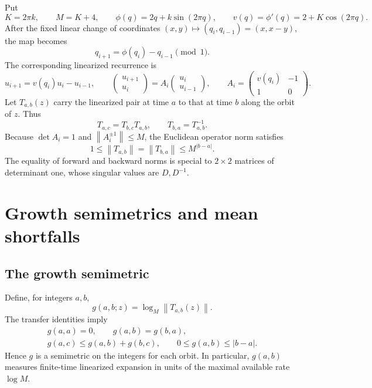 \documentclass[11pt,a4paper]{article}
\newcommand{\norm}[1]{\left\lVert #1\right\rVert}
\begin{document}
Put
\begin{equation}\label{eq:params}
 K=2\pi k,\qquad M=K+4,\qquad
 \phi(q)=2q+k\sin(2\pi q),\qquad
 v(q)=\phi'(q)=2+K\cos(2\pi q).
\end{equation}
After the fixed linear change of coordinates $(x,y)\mapsto(q_i,q_{i-1})=(x,x-y)$, the map becomes
\begin{equation}\label{eq:orbit}
 q_{i+1}=\phi(q_i)-q_{i-1}\pmod1.
\end{equation}
The corresponding linearized recurrence is
\begin{equation}\label{eq:linearization}
 u_{i+1}=v(q_i)u_i-u_{i-1},\qquad
 \begin{pmatrix}u_{i+1}\\u_i\end{pmatrix}
 =A_i\begin{pmatrix}u_i\\u_{i-1}\end{pmatrix},\qquad
 A_i=\begin{pmatrix}v(q_i)&-1\\1&0\end{pmatrix}.
\end{equation}
Let $T_{a,b}(z)$ carry the linearized pair at time $a$ to that at time $b$ along the orbit of $z$. Thus
\[
 T_{a,c}=T_{b,c}T_{a,b},\qquad T_{b,a}=T_{a,b}^{-1}.
\]
Because $\det A_i=1$ and $\norm{A_i^{\pm1}}\le M$, the Euclidean operator norm satisfies
\begin{equation}\label{eq:norm-bounds}
 1\le\norm{T_{a,b}}=\norm{T_{b,a}}\le M^{|b-a|}.
\end{equation}
The equality of forward and backward norms is special to $2\times2$ matrices of determinant one, whose singular values are $D,D^{-1}$.

\section{Growth semimetrics and mean shortfalls}

\subsection*{The growth semimetric}
Define, for integers $a,b$,
\begin{equation}\label{eq:g}
 \boxed{\quad g(a,b;z)=\log_M\norm{T_{a,b}(z)}.\quad}
\end{equation}
The transfer identities imply
\begin{equation}\label{eq:semimetric}
 \begin{gathered}
  g(a,a)=0,\qquad g(a,b)=g(b,a),\\
  g(a,c)\le g(a,b)+g(b,c),\qquad
  0\le g(a,b)\le |b-a|.
 \end{gathered}
\end{equation}
Hence $g$ is a semimetric on the integers for each orbit. In particular, $g(a,b)$ measures finite-time linearized expansion in units of the maximal available rate $\log M$.
\end{document}
